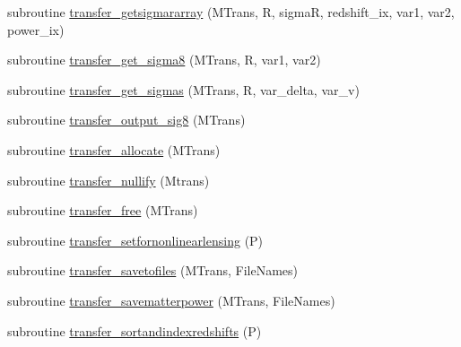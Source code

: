 \begin{DoxyCompactItemize}
\item 
subroutine \mbox{\hyperlink{namespacetransfer_a9f16a04226ffcb97b7f2bfc5b681f3b4}{transfer\+\_\+getsigmararray}} (M\+Trans, R, sigmaR, redshift\+\_\+ix, var1, var2, power\+\_\+ix)
\item 
subroutine \mbox{\hyperlink{namespacetransfer_a6330289a440bd51a5c55da9c40dee8a2}{transfer\+\_\+get\+\_\+sigma8}} (M\+Trans, R, var1, var2)
\item 
subroutine \mbox{\hyperlink{namespacetransfer_a94b4673ba4b74ac5aef785afde714446}{transfer\+\_\+get\+\_\+sigmas}} (M\+Trans, R, var\+\_\+delta, var\+\_\+v)
\item 
subroutine \mbox{\hyperlink{namespacetransfer_a7f7da292010e79184bed8cdb24e03d2b}{transfer\+\_\+output\+\_\+sig8}} (M\+Trans)
\item 
subroutine \mbox{\hyperlink{namespacetransfer_a687f977819e9abe471f86cff900939e7}{transfer\+\_\+allocate}} (M\+Trans)
\item 
subroutine \mbox{\hyperlink{namespacetransfer_a0e02ff3d1ba9dd5ad8c5dcaf76987ecc}{transfer\+\_\+nullify}} (Mtrans)
\item 
subroutine \mbox{\hyperlink{namespacetransfer_a34407967277591afeb26880a4f0926dc}{transfer\+\_\+free}} (M\+Trans)
\item 
subroutine \mbox{\hyperlink{namespacetransfer_ad877dbf164ab7d108432f41d21c155fd}{transfer\+\_\+setfornonlinearlensing}} (P)
\item 
subroutine \mbox{\hyperlink{namespacetransfer_adc67bad9d6015b3ecd203551b927d522}{transfer\+\_\+savetofiles}} (M\+Trans, File\+Names)
\item 
subroutine \mbox{\hyperlink{namespacetransfer_a4204b279b39e55f31b7948dec07fd7ed}{transfer\+\_\+savematterpower}} (M\+Trans, File\+Names)
\item 
subroutine \mbox{\hyperlink{namespacetransfer_a138e96e5b60355e8136607e26339b2a0}{transfer\+\_\+sortandindexredshifts}} (P)
\end{DoxyCompactItemize}
